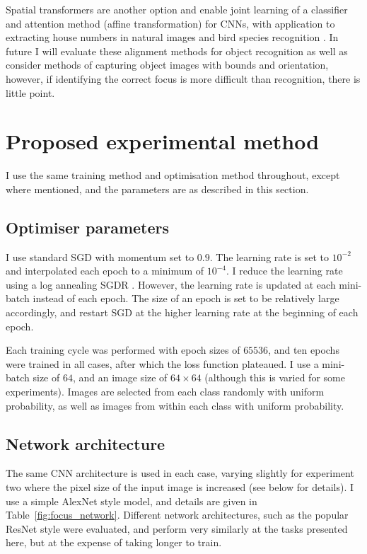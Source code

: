 Spatial transformers \cite{Jaderberg2015} are another option and enable joint learning of a classifier and attention method (affine transformation) for \gls{CNN}s, with application to extracting house numbers in natural images \cite{Netzer2011} and bird species recognition \cite{Wah2011}. In future I will evaluate these alignment methods for object recognition as well as consider methods of capturing object images with bounds and orientation, however, if identifying the correct focus is more difficult than recognition, there is little point.


\section{Proposed experimental method}

I use the same training method and optimisation method throughout, except where mentioned, and the parameters are as described in this section. 

\subsection {Optimiser parameters}

I use standard \gls{SGD} with momentum set to $ 0.9 $. The learning rate is set to $ 10^{-2} $ and interpolated each epoch to a minimum of $ 10^{-4} $. I reduce the learning rate using a log annealing \gls{SGDR}  \cite{Loshchilov2016}. However, the learning rate is updated at each mini-batch instead of each epoch. The size of an epoch is set to be relatively large accordingly, and restart SGD at the higher learning rate at the beginning of each epoch. 

Each training cycle was performed with epoch sizes of $65536$, and ten epochs were trained in all cases, after which the loss function plateaued. I use a mini-batch size of $64$, and an image size of $64\times64$ (although this is varied for some experiments). Images are selected from each class randomly with uniform probability, as well as images from within each class with uniform probability.

\subsection {Network architecture}

The same \gls{CNN} architecture is used in each case, varying slightly for experiment two where the pixel size of the input image is increased (see below for details). I use a simple AlexNet \cite {Krizhevsky2012} style model, and details are given in Table~\ref{fig:focus_network}. Different network architectures, such as the popular ResNet \cite{He} style were evaluated, and perform very similarly at the tasks presented here, but at the expense of taking longer to train.


